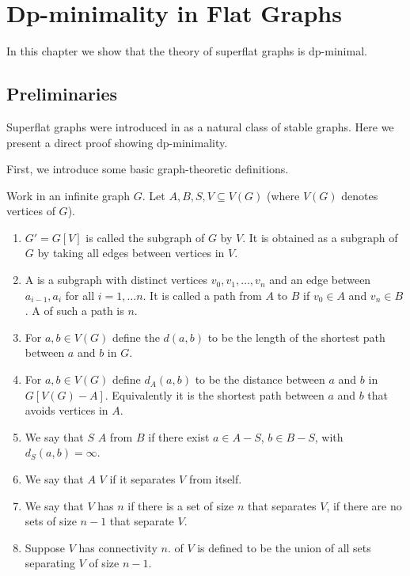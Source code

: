 \chapter{Dp-minimality in Flat Graphs}

In this chapter we show that the theory of superflat graphs is dp-minimal.

\section{Preliminaries}

Superflat graphs were introduced in \cite{stable_graphs} as a natural class of stable graphs. Here we present a direct proof showing dp-minimality.

First, we introduce some basic graph-theoretic definitions.
\begin{Definition}
  Work in an infinite graph $G$. Let $A, B, S, V \subseteq V(G)$ (where $V(G)$ denotes vertices of $G$).
  \begin{enumerate}
  \item $G' = G[V]$ is called the  subgraph of $G$  by $V$. It is obtained as a subgraph of $G$ by taking all edges between vertices in $V$.
  \item A  is a subgraph with distinct vertices $v_0, v_1, \ldots, v_n$ and an edge between $a_{i-1}, a_i$ for all $i = 1, \ldots n$.
    It is called a path from $A$ to $B$ if $v_0 \in A$ and $v_n \in B$.
    A  of such a path is $n$.
  \item For $a,b \in V(G)$ define the  $d(a,b)$ to be the length of the shortest path between $a$ and $b$ in $G$.
  \item For $a,b \in V(G)$ define $d_A(a,b)$ to be the distance between $a$ and $b$ in $G[V(G) - A]$. Equivalently it is the shortest path between $a$ and $b$ that avoids vertices in $A$.
  \item We say that $S$  $A$ from $B$ if there exist $a \in A - S$, $b \in B - S$, with $d_S(a,b) = \infty$.
  \item We say that $A$  $V$ if it separates $V$ from itself.
  \item We say that $V$ has  $n$ if there is a set of size $n$ that separates $V$,
    if there are no sets of size $n-1$ that separate $V$.
  \item Suppose $V$ has connectivity $n$.  of $V$ is defined to be the union of all sets separating $V$ of size $n-1$.
  \end{enumerate}
\end{Definition}


